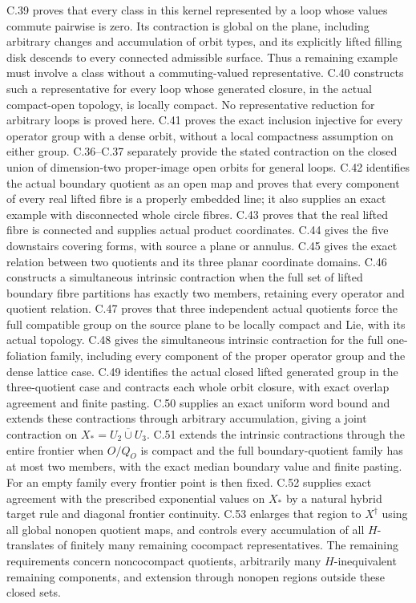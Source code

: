 C.39 proves that every class in this kernel represented by a loop
whose values commute pairwise is zero. Its contraction is global on
the plane, including arbitrary changes and accumulation of orbit types,
and its explicitly lifted filling disk descends to every connected
admissible surface. Thus a remaining example must involve a class
without a commuting-valued representative. C.40 constructs such a representative for every loop whose generated
closure, in the actual compact-open topology, is locally compact.
No representative reduction for arbitrary loops is proved here. C.41 proves the exact
inclusion injective for every operator group with a dense orbit,
without a local compactness assumption on either group. C.36--C.37 separately
provide the stated contraction on the closed union of dimension-two
proper-image open orbits for general loops. C.42 identifies the actual
boundary quotient as an open map and proves that every component of
every real lifted fibre is a properly embedded line; it also supplies
an exact example with disconnected whole circle fibres. C.43 proves
that the real lifted fibre is connected and supplies actual product
coordinates. C.44 gives the five downstairs covering forms, with
source a plane or annulus. C.45 gives the exact relation between two
quotients and its three planar coordinate domains. C.46 constructs a
simultaneous intrinsic contraction when the full set of lifted
boundary fibre partitions has exactly two members, retaining every
operator and quotient relation. C.47 proves that three independent
actual quotients force the full compatible group on the source plane
to be locally compact and Lie, with its actual topology. C.48 gives
the simultaneous intrinsic contraction for the full one-foliation
family, including every component of the proper operator group and
the dense lattice case. C.49 identifies the actual closed lifted
generated group in the three-quotient case and contracts each whole
orbit closure, with exact overlap agreement and finite pasting.
C.50 supplies an exact uniform word bound and extends these
contractions through arbitrary accumulation, giving a joint
contraction on $X_*=\overline{U_2\cup U_3}$. C.51 extends
the intrinsic contractions through the entire frontier when
$O/Q_O$ is compact and the full boundary-quotient family has
at most two members, with the exact median boundary value
and finite pasting. For an empty family every frontier point
is then fixed. C.52 supplies exact agreement with the
prescribed exponential values on $X_*$ by a natural hybrid
target rule and diagonal frontier continuity. C.53 enlarges
that region to $X^\dagger$ using all global nonopen quotient
maps, and controls every accumulation of all $H$-translates
of finitely many remaining cocompact representatives.
The remaining requirements concern noncocompact quotients,
arbitrarily many $H$-inequivalent remaining components, and
extension through nonopen regions outside these closed sets.

